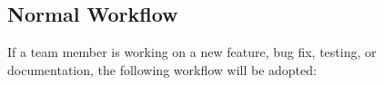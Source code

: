 \documentclass{article}
\begin{document}
\subsection{Normal Workflow}
If a team member is working on a new feature, bug fix, testing, or documentation,
the following workflow will be adopted:
\end{document}
